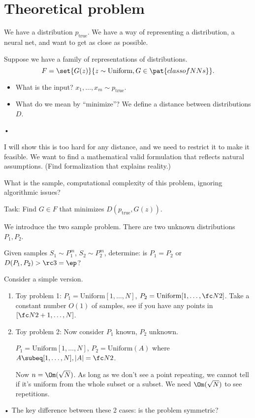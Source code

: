 \section{Theoretical problem}

 
We have a distribution $p_{\text{true}}$. We have a way of representing a distribution, a neural net, and want to get as close as possible.

Suppose we have a family of representations of distributions.
$$
F=\set{G(z)}{z\sim \text{Uniform}, G\in \pat{class of NNs}}.
$$
\begin{itemize}
\item
What is the input? $x_1,\ldots, x_m\sim p_{\text{true}}$.
\item
What do we mean by ``minimize''? We define a distance between distributions $D$.
\end{itemize}•

I will show this is too hard for any distance, and we need to restrict it to make it feasible. We want to find a mathematical valid formulation that reflects natural assumptions. (Find formalization that explains reality.) 

What is the sample, computational complexity of this problem, ignoring algorithmic issues?

Task: Find $G\in F$ that minimizes $D(p_{\text{true}}, G(z))$.

We introduce the two sample problem. There are two unknown distributions $P_1, P_2$. 

\begin{prb}
Given samples $S_1\sim P_1^m$, $S_2\sim P_2^m$, determine: is $P_1=P_2$ or $D(P_1,P_2)>\rc 3=\ep$?
\end{prb}


Consider a simple version. 
\begin{enumerate}
\item
Toy problem 1: 
$P_1=\text{Uniform}[1,\ldots, N]$, $P_2 = \text{Uniform}[1,\ldots, \fc N2]$. Take a constant number $O(1)$ of samples, see if you have any points in $[\fc N2+1,\ldots, N]$. 
\item
Toy problem 2:
Now consider $P_1$ known, $P_2$ unknown.

$P_1=\text{Uniform}[1,\ldots, N]$, $P_2 = \text{Uniform}(A)$ where $A\subeq [1,\ldots, N], |A|=\fc N2$. 

Now $n=\Om(\sqrt N)$. As long as we don't see a point repeating, we cannot tell if it's uniform from the whole subset or a subset. We need $\Om(\sqrt N)$ to see repetitions.
\end{enumerate}•
The key difference between these 2 cases: is the problem symmetric?

